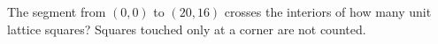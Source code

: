 The segment from $(0,0)$ to $(20,16)$ crosses the interiors of how many unit lattice squares? Squares touched only at a corner are not counted.
